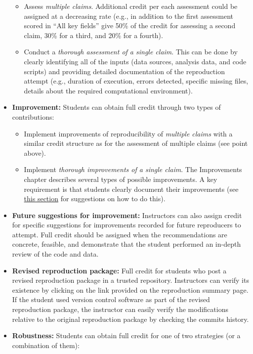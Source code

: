 \documentclass[
  openany]{book}
\providecommand{\tightlist}{%
  \setlength{\itemsep}{0pt}\setlength{\parskip}{0pt}}
\begin{document}
\begin{itemize}
  \begin{itemize}
  \tightlist
  \item
    Assess \emph{multiple claims}. Additional credit per each assessment could be assigned at a decreasing rate (e.g., in addition to the first assessment scored in ``All key fields'' give 50\% of the credit for assessing a second claim, 30\% for a third, and 20\% for a fourth).\\
  \item
    Conduct a \emph{thorough assessment of a single claim}. This can be done by clearly identifying all of the inputs (data sources, analysis data, and code scripts) and providing detailed documentation of the reproduction attempt (e.g., duration of execution, errors detected, specific missing files, details about the required computational environment).\\
  \end{itemize}
\item
  \textbf{Improvement:} Students can obtain full credit through two types of contributions:

  \begin{itemize}
  \tightlist
  \item
    Implement improvements of reproducibility of \emph{multiple claims} with a similar credit structure as for the assessment of multiple claims (see point above).\\
  \item
    Implement \emph{thorough improvements of a single claim}. The Improvements chapter describes several types of possible improvements. A key requirement is that students clearly document their improvements (see \href{https://bitss.github.io/ACRE/improvements.html\#doc-impr}{this section} for suggestions on how to do this).\\
  \end{itemize}
\item
  \textbf{Future suggestions for improvement:} Instructors can also assign credit for specific suggestions for improvements recorded for future reproducers to attempt. Full credit should be assigned when the recommendations are concrete, feasible, and demonstrate that the student performed an in-depth review of the code and data.\\
\item
  \textbf{Revised reproduction package:} Full credit for students who post a revised reproduction package in a trusted repository. Instructors can verify its existence by clicking on the link provided on the reproduction summary page. If the student used version control software as part of the revised reproduction package, the instructor can easily verify the modifications relative to the original reproduction package by checking the commits history.\\
\item
  \textbf{Robustness:} Students can obtain full credit for one of two strategies (or a combination of them):


\end{itemize}
\end{document}
